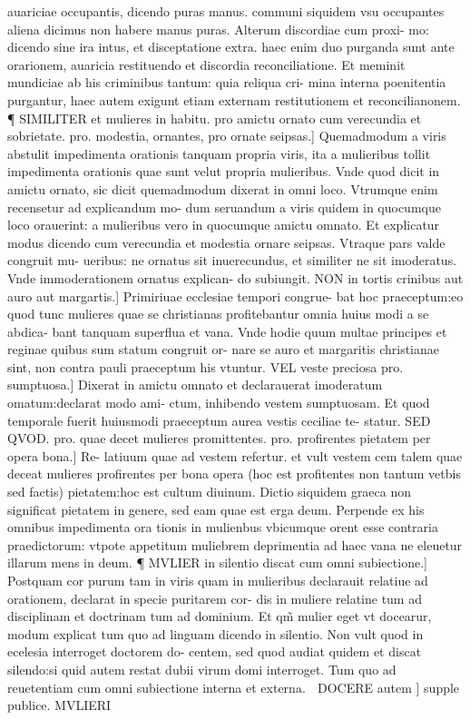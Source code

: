 \documentclass{article}
\begin{document}
\begin{pages}
auariciae occupantis, dicendo puras manus. communi siquidem vsu occupantes aliena dicimus non habere manus puras. Alterum discordiae cum proxi- mo: dicendo sine ira intus, et disceptatione extra. haec enim duo purganda sunt ante orarionem, auaricia restituendo et discordia reconciliatione. Et meminit mundiciae ab his criminibus tantum: quia reliqua cri- mina interna poenitentia purgantur, haec autem exigunt etiam externam restitutionem et reconcilianonem. ¶ SIMILITER et mulieres in habitu. pro amictu ornato cum verecundia et sobrietate. pro. modestia, ornantes, pro ornate seipsas.] Quemadmodum a viris abstulit impedimenta orationis tanquam propria viris, ita a mulieribus tollit impedimenta orationis quae sunt velut propria mulieribus. Vnde quod dicit in amictu ornato, sic dicit quemadmodum dixerat in omni loco. Vtrumque enim recensetur ad explicandum mo- dum seruandum a viris quidem in quocumque loco orauerint: a mulieribus vero in quocumque amictu omnato. Et explicatur modus dicendo cum verecundia et modestia ornare seipsas. Vtraque pars valde congruit mu- ueribus: ne ornatus sit inuerecundus, et similiter ne sit imoderatus. Vnde immoderationem ornatus explican- do subiungit. NON in tortis crinibus aut auro aut margartis.] Primiriuae ecclesiae tempori congrue- bat hoc praeceptum:eo quod tunc mulieres quae se christianas profitebantur omnia huius modi a se abdica- bant tanquam superflua et vana. Vnde hodie quum multae principes et reginae quibus sum statum congruit or- nare se auro et margaritis christianae sint, non contra pauli praeceptum his vtuntur. VEL veste preciosa pro. sumptuosa.] Dixerat in amictu omnato et declarauerat imoderatum omatum:declarat modo ami- ctum, inhibendo vestem sumptuosam. Et quod temporale fuerit huiusmodi praeceptum aurea vestis ceciliae te- statur. SED QVOD. pro. quae decet mulieres promittentes. pro. profirentes pietatem per opera bona.] Re- latiuum quae ad vestem refertur. et vult vestem cem talem quae deceat mulieres profirentes per bona opera (hoc est profitentes non tantum vetbis sed factis) pietatem:hoc est cultum diuinum. Dictio siquidem graeca non significat pietatem in genere, sed eam quae est erga deum. Perpende ex his omnibus impedimenta ora tionis in mulienbus vbicumque orent esse contraria praedictorum: vtpote appetitum muliebrem deprimentia ad haec vana ne eleuetur illarum mens in deum. ¶ MVLIER in silentio discat cum omni subiectione.] Postquam cor purum tam in viris quam in mulieribus declarauit relatiue ad orationem, declarat in specie puritarem cor- dis in muliere relatine tum ad disciplinam et doctrinam tum ad dominium. Et qm̃ mulier eget vt docearur, modum explicat tum quo ad linguam dicendo in silentio. Non vult quod in ecelesia interroget doctorem do- centem, sed quod audiat quidem et discat silendo:si quid autem restat dubii virum domi interroget. Tum quo ad reuetentiam cum omni subiectione interna et externa.  DOCERE autem ] supple publice. MVLIERI  \pend
\marginpar{[ p.142 ]}

\end{pages}
\end{document}

